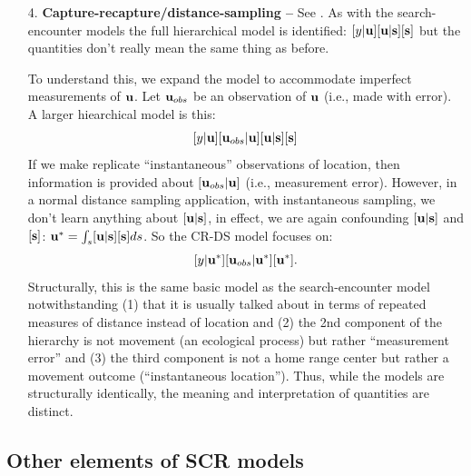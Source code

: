 \begin{itemize}
\item[4.] {\bf Capture-recapture/distance-sampling -- } See
  \citet{borchers_etal:1998}. As with the search-encounter models the
full hierarchical model is identified:
$[y|{\bf u}][{\bf u}|{\bf s}][{\bf s}]$ but the quantities don't
really mean the same thing as before. 

To understand this, we expand the model to accommodate imperfect
measurements of ${\bf u}$. Let ${\bf u}_{obs}$ be an observation of
${\bf u}$ (i.e., made with error). A larger hiearchical model is this:
\[
[y|{\bf u}][{\bf u}_{obs}|{\bf u}][{\bf u}|{\bf s}][{\bf s}]
\]
If we make replicate ``instantaneous'' observations of location, then
information is provided about 
 $[{\bf u}_{obs}|{\bf u}]$ (i.e., measurement error). However, in a normal
 distance sampling application, with instantaneous sampling, we don't
 learn anything about $[{\bf u}|{\bf s}]$, 
in effect, we are again confounding $[{\bf u}|{\bf s}]$ and $[{\bf
  s}]$: ${\bf u}^{*} = \int_{s} [{\bf u}|{\bf s}][{\bf s}] ds$. So the CR-DS model focuses on:
\[
[y|{\bf u}^{*}][{\bf u}_{obs}|{\bf u}^{*}][{\bf u}^{*}].
\]
Structurally, this is the same basic model as the search-encounter
model notwithstanding (1) that it is usually talked about in terms of
repeated measures of distance instead of location and (2) the 2nd
component of the hierarchy is not movement (an ecological process) but
rather ``measurement error'' and (3) the third component is not a home
range center but rather a movement outcome (``instantaneous
location'').  Thus, while the models are structurally identically, the
meaning and interpretation of quantities are distinct. 

\end{itemize}


\subsection{Other elements of SCR models}

